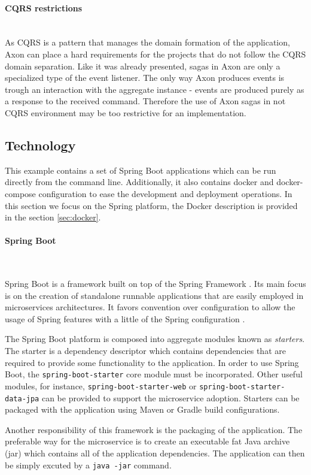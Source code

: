 \documentclass[oneside,
  digital, %
  table,   %
  nolof,     %
  nolot,     %
]{fithesis3}
\newcommand{\newlinepar}[1]{\paragraph{#1}\needspace{4\baselineskip}\mbox{}\\}
\begin{document}
\newlinepar{CQRS restrictions}

As CQRS is a pattern that manages the domain formation of the application, Axon can place a hard requirements for the projects that do not follow the CQRS domain separation. Like it was already presented, sagas in Axon are only a specialized type of the event listener. The only way Axon produces events is trough an interaction with the aggregate instance - events are produced purely as a response to the received command. Therefore the use of Axon sagas in not CQRS environment may be too restrictive for an implementation.

\subsection{Technology}

This example contains a set of Spring Boot applications which can be run directly from the command line. Additionally, it also contains docker and docker-compose configuration to ease the development and deployment operations. In this section we focus on the Spring platform, the Docker description is provided in the section \ref{sec:docker}.

\newlinepar{Spring Boot}
\label{sec:spring-boot}

Spring Boot is a framework built on top of the Spring Framework \cite{spring_ms}. Its main focus is on the creation of standalone runnable applications that are easily employed in microservices architectures. It favors convention over configuration to allow the usage of Spring features with a little of the Spring configuration \cite{spring_boot}.

The Spring Boot platform is composed into aggregate modules known as \textit{starters}. The starter is a dependency descriptor which contains dependencies that are required to provide some functionality to the application. In order to use Spring Boot, the \texttt{spring-boot-starter} core module must be incorporated. Other useful modules, for instance, \texttt{spring-boot-starter-web} or \texttt{spring-boot-starter-data-jpa} can be provided to support the microservice adoption. Starters can be packaged with the application using Maven or Gradle build configurations.

Another responsibility of this framework is the packaging of the application. The preferable way for the microservice is to create an executable fat Java archive (jar) which contains all of the application dependencies. The application can then be simply excuted by a \texttt{java -jar} command.
\end{document}
